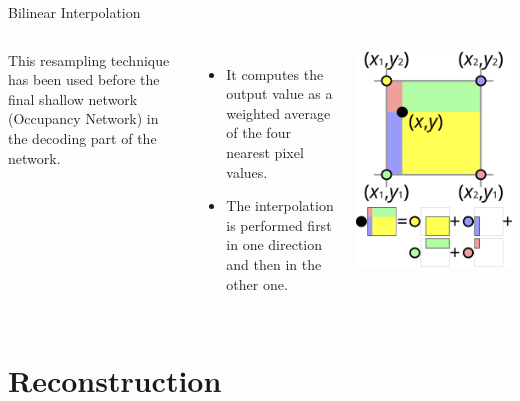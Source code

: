 \documentclass{beamer}
\begin{document}
\begin{frame}{Bilinear Interpolation}
  \begin{columns}[T]
    \vspace{1em}
      This resampling technique has been used before the final shallow network (Occupancy Network) in the decoding part of the network.

      \begin{itemize}
          \item It computes the output value as a weighted average of the four nearest pixel values.
          \item The interpolation is performed first in one direction and then in the other one.
      \end{itemize}

      \vspace{-2.5em}
      \centering
      \includegraphics[width=0.65\linewidth]{../Media/bilinear.png}
  \end{columns}
\end{frame}

\section{Reconstruction}
\end{document}
